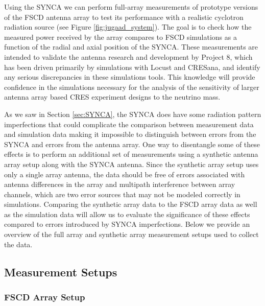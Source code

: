 Using the SYNCA we can perform full-array measurements of prototype versions of the FSCD antenna array to test its performance with a realistic cyclotron radiation source (see Figure \ref{fig:jugaad_system}). The goal is to check how the measured power received by the array compares to FSCD simulations as a function of the radial and axial position of the SYNCA. These measurements are intended to validate the antenna research and development by Project 8, which has been driven primarily by simulations with Locust and CRESana, and identify any serious discrepancies in these simulations tools. This knowledge will provide confidence in the simulations necessary for the analysis of the sensitivity of larger antenna array based CRES experiment designs to the neutrino mass.

As we saw in Section \ref{sec:SYNCA}, the SYNCA does have some radiation pattern imperfections that could complicate the comparison between measurement data and simulation data making it impossible to distinguish between errors from the SYNCA and errors from the antenna array. One way to disentangle some of these effects is to perform an additional set of measurements using a synthetic antenna array setup along with the SYNCA antenna. Since the synthetic array setup uses only a single array antenna, the data should be free of errors associated with antenna differences in the array and multipath interference between array channels, which are two error sources that may not be modeled correctly in simulations. Comparing the synthetic array data to the FSCD array data as well as the simulation data will allow us to evaluate the significance of these effects compared to errors introduced by SYNCA imperfections. Below we provide an overview of the full array and synthetic array measurement setups used to collect the data.

\subsection{Measurement Setups}

\subsubsection{FSCD Array Setup}


